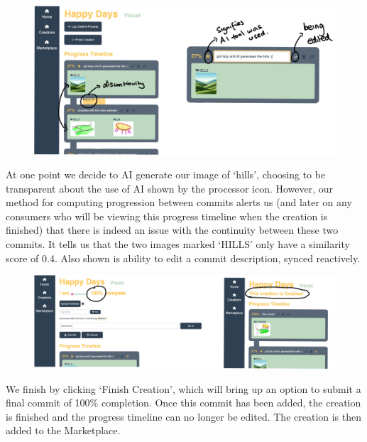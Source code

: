\documentclass[12pt,a4paper]{article}
\begin{document}
\begin{figure}[H]
    \centering
    \includegraphics[scale=0.27]{tagging3.png}
\end{figure}
\noindent At one point we decide to AI generate our image of `hills', choosing to be transparent about the use of AI shown by the processor icon. However, our method for computing progression between commits alerts us (and later on any consumers who will be viewing this progress timeline when the creation is finished) that there is indeed an issue with the continuity between these two commits. It tells us that the two images marked `HILLS' only have a similarity score of 0.4. Also shown is ability to edit a commit description, synced reactively.
\begin{figure}[H]
    \centering
    \includegraphics[scale=0.23]{finished.png}
\end{figure}
\noindent We finish by clicking `Finish Creation', which will bring up an option to submit a final commit of 100\% completion. Once this commit has been added, the creation is finished and the progress timeline can no longer be edited. The creation is then added to the Marketplace.
\end{document}
